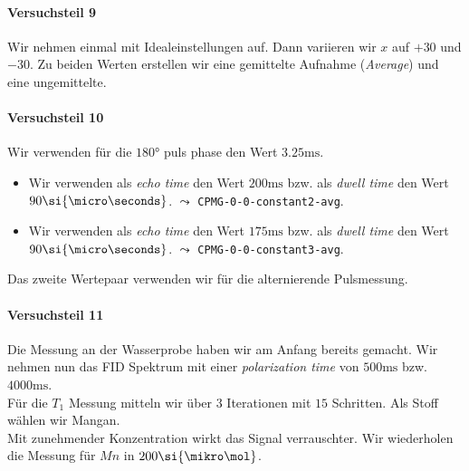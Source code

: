 \documentclass{subfiles}
\begin{document}
\paragraph*{Versuchsteil 9}
    Wir nehmen einmal mit Idealeinstellungen auf. Dann variieren wir $x$ auf $+30$ und $-30$. Zu beiden Werten erstellen wir eine gemittelte Aufnahme (\emph{Average}) und eine ungemittelte.


\paragraph*{Versuchsteil 10}
    Wir verwenden für die $180\si{\degree}$ puls phase den Wert $3.25\si{\ms}$. 
    \begin{itemize}
        \item Wir verwenden als \emph{echo time} den Wert $200\si{\ms}$ bzw. als \emph{dwell time} den Wert $90\si{\micro\seconds}$. $\leadsto$ \texttt{CPMG-0-0-constant2-avg}.
        \item Wir verwenden als \emph{echo time} den Wert $175\si{\ms}$ bzw. als \emph{dwell time} den Wert $90\si{\micro\seconds}$. $\leadsto$ \texttt{CPMG-0-0-constant3-avg}.
    \end{itemize}
    Das zweite Wertepaar verwenden wir für die alternierende Pulsmessung. 

\paragraph*{Versuchsteil 11}
    Die Messung an der Wasserprobe haben wir am Anfang bereits gemacht. Wir nehmen nun das FID Spektrum mit einer \emph{polarization time} von $500\si{\ms}$ bzw. $4000\si{\ms}$. \\

    Für die $T_1$ Messung mitteln wir über $3$ Iterationen mit $15$ Schritten. Als Stoff wählen wir Mangan. \\

    Mit zunehmender Konzentration wirkt das Signal verrauschter. Wir wiederholen die Messung für $Mn$ in $200\si{\mikro\mol}$. \\
    
\end{document}
